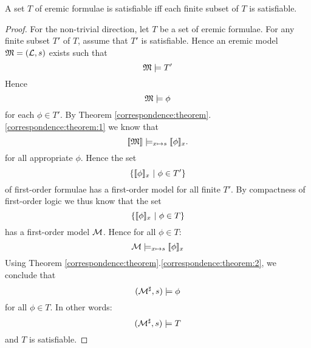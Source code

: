 \begin{theorem}
A set $T$ of eremic formulae is satisfiable iff each finite subset of
$T$ is satisfiable.
\end{theorem}
\begin{proof}
For the non-trivial direction, let $T$ be a set of eremic formulae.
For any finite subset $T'$ of $T$, assume that $T'$ is satisfiable.
Hence an eremic model $\frak{M} = (\mathcal{L}, s)$ exists such that
\[
   \frak{M} \models T'
\]
Hence 
\[
   \frak{M} \models \phi
\]
for each $\phi \in T'$. By Theorem \ref{correspondence:theorem}.\ref{correspondence:theorem:1} we know that
\[
   \lbrack\!\lbrack \frak{M} \rbrack\!\rbrack \models_{x \mapsto s} \lbrack\!\lbrack \phi \rbrack\!\rbrack_x.
\]
for all appropriate $\phi$. Hence the set 
\[
   \{ \lbrack\!\lbrack \phi \rbrack\!\rbrack_x\ |\ \phi \in T'\}
\]
of first-order formulae has a first-order model for all finite $T'$.
By compactness of first-order logic we thus know that the set
\[
   \{ \lbrack\!\lbrack \phi \rbrack\!\rbrack_x\ |\ \phi \in T\}
\]
has a first-order model $\mathcal{M}$. Hence for all $\phi \in T$:
\[
   \mathcal{M} \models_{x \mapsto s} \lbrack\!\lbrack \phi \rbrack\!\rbrack_x
\]
Using Theorem
\ref{correspondence:theorem}.\ref{correspondence:theorem:2}, we
conclude that
\[
   (\mathcal{M}^{\sharp}, s) \models \phi
\]
for all $\phi \in T$. In other words:
\[
   (\mathcal{M}^{\sharp}, s) \models T
\]
and $T$ is satisfiable.
\end{proof}


